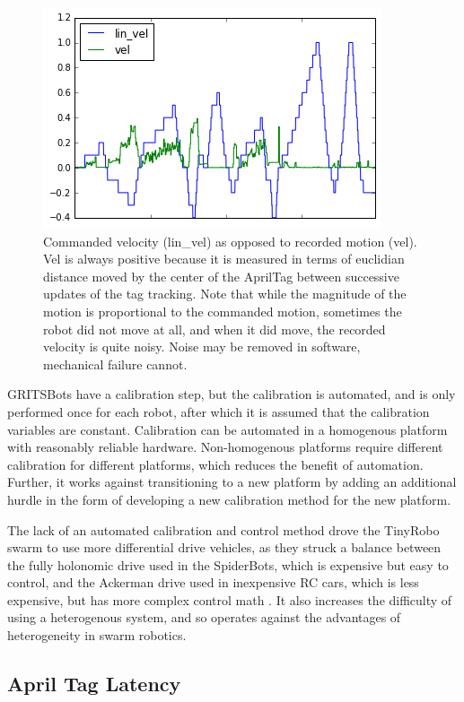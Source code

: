 \documentclass[]{article}
\begin{document}
\begin{figure}[t]
\includegraphics{../thesis/motion_vs_cmd}
\centering
\caption{Commanded velocity (lin\_vel) as opposed to recorded motion (vel). Vel is always positive because it is measured in terms of euclidian distance moved by the center of the AprilTag between successive updates of the tag tracking. 
Note that while the magnitude of the motion is proportional to the commanded motion, sometimes the robot did not move at all, and when it did move, the recorded velocity is quite noisy. Noise may be removed in software, mechanical failure cannot.} 
\label{motor-speed-fig}
\end{figure}

GRITSBots have a calibration step, but the calibration is automated, and is only performed once for each robot, after which it is assumed that the calibration variables are constant.
Calibration can be automated in a homogenous platform with reasonably reliable hardware. 
Non-homogenous platforms require different calibration for different platforms, which reduces the benefit of automation. 
Further, it works against transitioning to a new platform by adding an additional hurdle in the form of developing a new calibration method for the new platform. 

The lack of an automated calibration and control method drove the TinyRobo swarm to use more differential drive vehicles, as they struck a balance between the fully holonomic drive used in the SpiderBots, which is expensive but easy to control, and the Ackerman drive used in inexpensive RC cars, which is less expensive, but has more complex control math \cite{lairdspider}.
It also increases the difficulty of using a heterogenous system, and so operates against the advantages of heterogeneity in swarm robotics. 

\subsection{April Tag Latency} \label{section:April_Tag_Latency}
\end{document}
